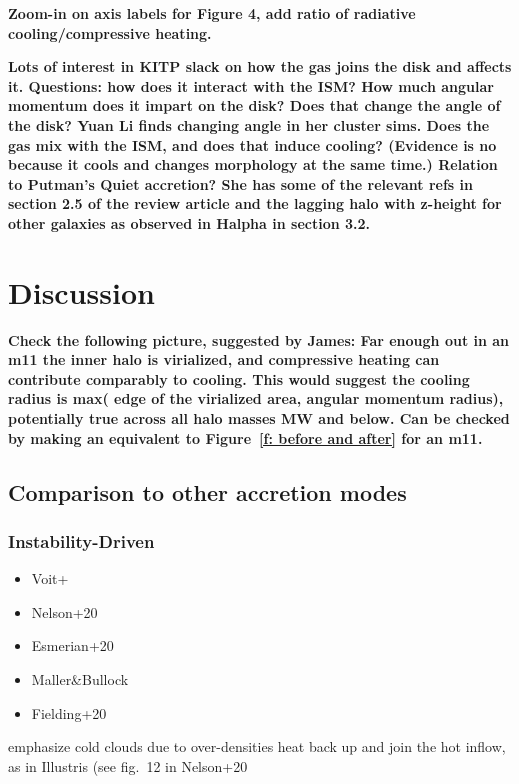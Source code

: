 \documentclass[fleqn,usenatbib]{mnras}
\begin{document}
\textbf{Zoom-in on axis labels for Figure 4, add ratio of radiative cooling/compressive heating.}

\textbf{
Lots of interest in KITP slack on how the gas joins the disk and affects it.
Questions: how does it interact with the ISM?
How much angular momentum does it impart on the disk? Does that change the angle of the disk? Yuan Li finds changing angle in her cluster sims.
Does the gas mix with the ISM, and does that induce cooling? (Evidence is no because it cools and changes morphology at the same time.)
Relation to Putman's Quiet accretion? She has some of the relevant refs in section 2.5 of the review article and the lagging halo with z-height for other galaxies as observed in Halpha in section 3.2.
}

\section{Discussion}
\label{s: discussion}

\textbf{
Check the following picture, suggested by James:
Far enough out in an m11 the inner halo is virialized, and compressive heating can contribute comparably to cooling.
This would suggest the cooling radius is max( edge of the virialized area, angular momentum radius), potentially true across all halo masses MW and below.
Can be checked by making an equivalent to Figure~\ref{f: before and after} for an m11.
}

\subsection{Comparison to other accretion modes}
\label{s: other modes}

\subsubsection{Instability-Driven}

\begin{itemize}
\item Voit+
\item  Nelson+20
\item  Esmerian+20
\item  Maller\&Bullock
\item Fielding+20
\end{itemize}
emphasize cold clouds due to over-densities heat back up and join the hot inflow, as in Illustris (see fig.~12 in Nelson+20
\end{document}
